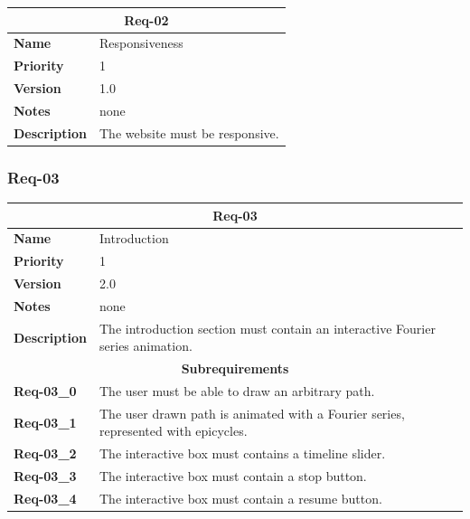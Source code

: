 \documentclass{article}
\begin{document}
\bgroup{}
\def\arraystretch{1.25}
\begin{center}
    \begin{tabular}{ |l|p{9cm}| }
        \hline
        \multicolumn{2}{|c|}{\textbf{Req-02}} \\
        \hline
        \textbf{Name} & Responsiveness \\
        \hline
        \textbf{Priority} & 1 \\
        \hline
        \textbf{Version} & 1.0 \\
        \hline
        \textbf{Notes} & none \\
        \hline
        \textbf{Description}
        & The website must be responsive. \\
        \hline
    \end{tabular}
\end{center}
\egroup{}

\subsubsection{Req-03}

\bgroup{}
\def\arraystretch{1.25}
\begin{center}
    \begin{tabular}{ |l|p{9cm}| }
        \hline
        \multicolumn{2}{|c|}{\textbf{Req-03}} \\
        \hline
        \textbf{Name} & Introduction \\
        \hline
        \textbf{Priority} & 1 \\
        \hline
        \textbf{Version} & 2.0 \\
        \hline
        \textbf{Notes} & none \\
        \hline
        \textbf{Description}
        & The introduction section must contain an interactive Fourier series animation. \\
        \hline
        \multicolumn{2}{|c|}{\textbf{Subrequirements}} \\
        \hline
        \textbf{Req-03\_0} & The user must be able to draw an arbitrary path. \\
        \hline
        \textbf{Req-03\_1} & The user drawn path is animated with a Fourier series, represented with epicycles. \\
        \hline
        \textbf{Req-03\_2} & The interactive box must contains a timeline slider. \\
        \hline
        \textbf{Req-03\_3} & The interactive box must contain a stop button. \\
        \hline
        \textbf{Req-03\_4} & The interactive box must contain a resume button. \\
        \hline
    \end{tabular}
\end{center}
\egroup{}
\end{document}

